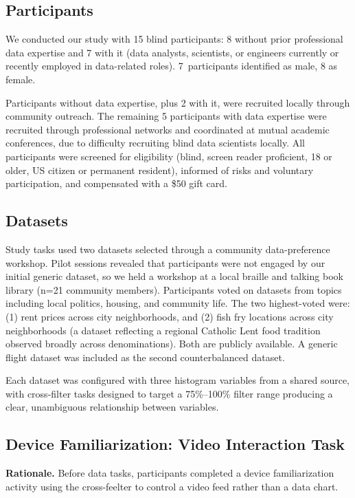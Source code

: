 \documentclass[12pt]{cmuthesis}
\begin{document}
 
\subsection{Participants} 

We conducted our study with 15 blind participants: 8 without prior professional data expertise and 7 with it (data analysts, scientists, or engineers currently or recently employed in data-related roles). 7~participants identified as male, 8 as female.

Participants without data expertise, plus 2 with it, were recruited locally through community outreach. The remaining 5 participants with data expertise were recruited through professional networks and coordinated at mutual academic conferences, due to difficulty recruiting blind data scientists locally. All participants were screened for eligibility (blind, screen reader proficient, 18 or older, US citizen or permanent resident), informed of risks and voluntary participation, and compensated with a \$50 gift card.

 
\subsection{Datasets} 

Study tasks used two datasets selected through a community data-preference workshop. Pilot sessions revealed that participants were not engaged by our initial generic dataset, so we held a workshop at a local braille and talking book library (n=21 community members). Participants voted on datasets from topics including local politics, housing, and community life. The two highest-voted were: (1) rent prices across city neighborhoods, and (2) fish fry locations across city neighborhoods (a dataset reflecting a regional Catholic Lent food tradition observed broadly across denominations). Both are publicly available. A generic flight dataset was included as the second counterbalanced dataset.

Each dataset was configured with three histogram variables from a shared source, with cross-filter tasks designed to target a 75\%--100\% filter range producing a clear, unambiguous relationship between variables.

 
\subsection{Device Familiarization: Video Interaction Task} 
\label{sec:videotraining}

\textbf{Rationale.} Before data tasks, participants completed a device familiarization activity using the cross-feelter to control a video feed rather than a data chart.
\end{document}

